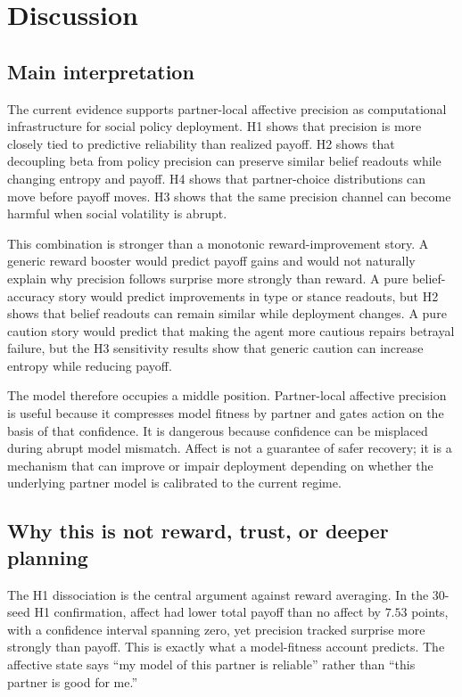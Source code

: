 \section{Discussion}

\subsection{Main interpretation}

The current evidence supports partner-local affective precision as computational infrastructure for social policy deployment. H1 shows that precision is more closely tied to predictive reliability than realized payoff. H2 shows that decoupling beta from policy precision can preserve similar belief readouts while changing entropy and payoff. H4 shows that partner-choice distributions can move before payoff moves. H3 shows that the same precision channel can become harmful when social volatility is abrupt.

This combination is stronger than a monotonic reward-improvement story. A generic reward booster would predict payoff gains and would not naturally explain why precision follows surprise more strongly than reward. A pure belief-accuracy story would predict improvements in type or stance readouts, but H2 shows that belief readouts can remain similar while deployment changes. A pure caution story would predict that making the agent more cautious repairs betrayal failure, but the H3 sensitivity results show that generic caution can increase entropy while reducing payoff.

The model therefore occupies a middle position. Partner-local affective precision is useful because it compresses model fitness by partner and gates action on the basis of that confidence. It is dangerous because confidence can be misplaced during abrupt model mismatch. Affect is not a guarantee of safer recovery; it is a mechanism that can improve or impair deployment depending on whether the underlying partner model is calibrated to the current regime.

\subsection{Why this is not reward, trust, or deeper planning}

The H1 dissociation is the central argument against reward averaging. In the 30-seed H1 confirmation, affect had lower total payoff than no affect by $7.53$ points, with a confidence interval spanning zero, yet precision tracked surprise more strongly than payoff. This is exactly what a model-fitness account predicts. The affective state says ``my model of this partner is reliable'' rather than ``this partner is good for me.''

